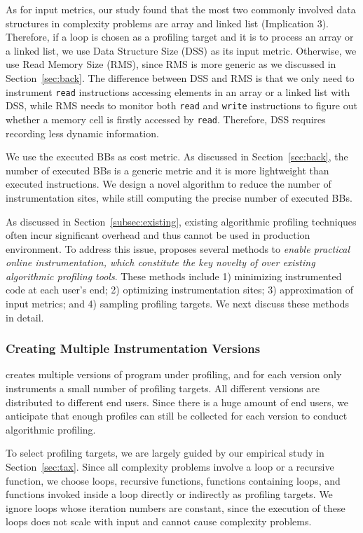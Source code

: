 As for input metrics, our study found that the most two commonly involved 
data structures in complexity problems 
are array and linked list (Implication 3). 
Therefore, if a loop is chosen as a profiling target 
and it is to process an array 
or a linked list, we use Data Structure Size (DSS) as its input metric. 
Otherwise, we use Read Memory Size (RMS), 
since RMS is more generic as we discussed in Section~\ref{sec:back}. 
The difference between DSS and RMS is that 
we only need to instrument \texttt{read} instructions accessing elements 
in an array or a linked list with DSS,
while RMS needs to monitor both \texttt{read} and \texttt{write}
instructions to figure out whether a memory cell is 
firstly accessed by \texttt{read}.
Therefore, DSS requires recording less dynamic information. 


We use the executed BBs as cost metric. 
As discussed in Section~\ref{sec:back}, 
the number of executed BBs is a generic metric 
and it is more lightweight than executed instructions. 
We design a novel algorithm to reduce the number of instrumentation sites,
while still computing the precise number of executed BBs. 



As discussed in Section~\ref{subsec:existing}, 
existing algorithmic profiling techniques
often incur significant overhead and thus cannot be used in production
environment. To address this issue, \Tool proposes several 
methods to \emph{enable practical online instrumentation, which 
constitute the key novelty of \Tool over existing algorithmic profiling tools}.
These methods include 1) 
minimizing instrumented code at each user's end; 
2) optimizing instrumentation sites;
3) approximation of input metrics;
and 4) sampling profiling targets. 
We next discuss these methods in detail.


\subsubsection{Creating Multiple Instrumentation Versions}

\Tool creates multiple versions of program under profiling, 
and for each version \Tool only instruments a small number of 
profiling targets. 
All different versions are distributed to different end users. 
Since there is a huge amount of end users, 
we anticipate that enough profiles can still be collected 
for each version to conduct algorithmic profiling. 

To select profiling targets, 
we are largely guided by our empirical 
study in Section~\ref{sec:tax}.
Since all complexity problems involve a 
loop or a recursive function, 
we choose loops, recursive functions, functions containing loops,
and functions invoked inside a loop directly 
or indirectly as profiling targets. 
We ignore loops whose iteration numbers are constant,
since the execution of these loops does not scale with input 
and cannot cause complexity problems.


